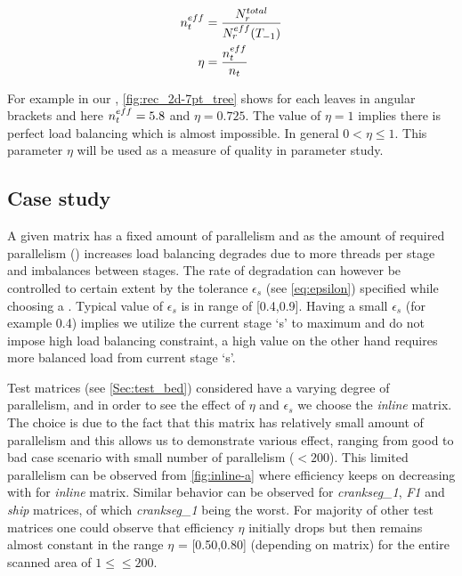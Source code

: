 \begin{align}
	\threadEffMath &= \frac{\nrowsMath^{total}}{\nrowsEffMath(T_{-1})} \\
	\eta &= \frac{\threadEffMath}{\nthreadsMath} \label{eq:eta}
\end{align}

For example in our \stex, \cref{fig:rec_2d-7pt_tree} shows \nrowsEff for each leaves in angular brackets and here $n_{t}^{eff} = 5.8$ and $\eta = 0.725$. The value of $\eta = 1$ implies there is perfect load balancing which is almost impossible. In general $0 < \eta \leq 1$. This parameter $\eta$ will be used as a measure of quality in parameter study.

\subsection{Case study}
A given matrix has a fixed amount of parallelism and as the amount of required parallelism (\nthreads) increases load balancing degrades due to more threads per stage and imbalances between stages. The rate of degradation can however be controlled to certain extent by the tolerance $\epsilon_s$ (see \cref{eq:epsilon}) specified while choosing a \levelGroup. Typical value of $\epsilon_s$ is in range of [0.4,0.9]. Having a small $\epsilon_s$ (for example 0.4) implies we utilize the current stage `s' to maximum and do not impose high load balancing constraint, a high value on the other hand requires more balanced load from current stage `s'. 

Test matrices (see \cref{Sec:test_bed}) considered have a varying degree of parallelism, and in order to see the effect of $\eta$ and $\epsilon_s$ we choose the \emph{inline} matrix. The choice is due to the fact that this matrix has relatively small amount of parallelism and this allows us to demonstrate various effect, ranging from good to bad case scenario with small number of parallelism (\nthreads$ < 200$). This limited parallelism can be observed from \cref{fig:inline-a} 
where efficiency keeps on decreasing with \nthreads for \emph{inline} matrix. Similar behavior can be observed for \emph{crankseg\_1}, \emph{F1} and \emph{ship} matrices, of which \emph{crankseg\_1} being the worst. For majority of other test matrices one could observe that efficiency $\eta$ initially drops but then remains almost constant in the range $\eta$ = [0.50,0.80] (depending on matrix) for the entire scanned area of $1 \leq $\nthreads$ \leq 200$.

